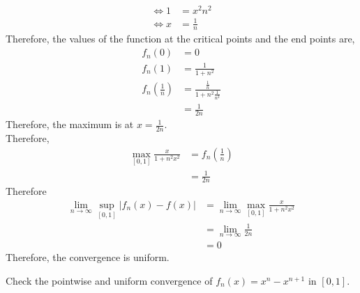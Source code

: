 \documentclass[fleqn, a4paper, 12pt, twoside]{article}
\theoremstyle{definition}
\theoremstyle{theorem}
\begin{document}
\begin{solution}
\begin{align*}
		\iff 1                                         & = x^2 n^2 \\
		\iff x                                         & = \frac{1}{n}
	\end{align*}
	Therefore, the values of the function at the critical points and the end points are,
	\begin{align*}
		f_n(0)                         & = 0                                         \\
		f_n(1)                         & = \frac{1}{1 + n^2}                         \\
		f_n \left( \frac{1}{n} \right) & = \frac{\frac{1}{n}}{1 + n^2 \frac{1}{n^2}} \\
                                               & = \frac{1}{2 n}
	\end{align*}
	Therefore, the maximum is at $x = \frac{1}{2 n}$.\\
	Therefore,
	\begin{align*}
		\max\limits_{[0,1]} \frac{x}{1 + n^2 x^2} & = f_n \left( \frac{1}{n} \right) \\
                                                          & = \frac{1}{2 n}
	\end{align*}
	Therefore
	\begin{align*}
		\lim\limits_{n \to \infty} \sup\limits_{[0,1]} \left| f_n(x) - f(x) \right| & = \lim\limits_{n \to \infty} \max\limits_{[0,1]} \frac{x}{1 + n^2 x^2} \\
                                                                                            & = \lim\limits_{n \to \infty} \frac{1}{2 n}                             \\
                                                                                            & = 0
	\end{align*}
	Therefore, the convergence is uniform.
\end{solution}

\begin{question}
	Check the pointwise and uniform convergence of $f_n(x) = x^n - x^{n + 1}$ in $[0,1]$.
\end{question}
\end{document}
